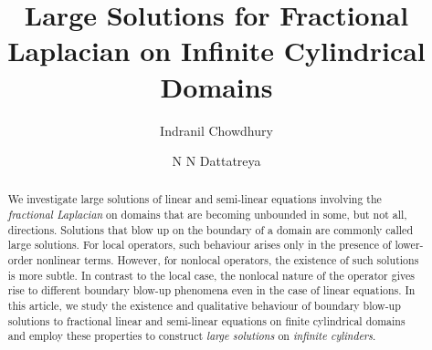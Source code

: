 \documentclass{amsart}
\title{Large Solutions for Fractional Laplacian on Infinite Cylindrical Domains}
\author[I. Chowdhury]{Indranil Chowdhury}
\author[N.  Dattatreya]{N N Dattatreya}
\date{}
\begin{document}
\begin{abstract}



We investigate large solutions of linear and semi-linear equations involving the \emph{fractional Laplacian} on domains that are becoming unbounded in some, but not all, directions. Solutions that blow up on the boundary of a domain are commonly called large solutions. For local operators, such behaviour arises only in the presence of lower-order nonlinear terms.  However, for nonlocal operators, the existence of such solutions is more subtle. In contrast to the local case, the nonlocal nature of the operator gives rise to different boundary blow-up phenomena even in the case of linear equations. In this article, we study the existence and qualitative behaviour of boundary blow-up solutions to fractional linear and semi-linear equations on finite cylindrical domains and employ these properties to construct \emph{large solutions} on \emph{infinite cylinders}. 


\end{abstract}
\end{document}
